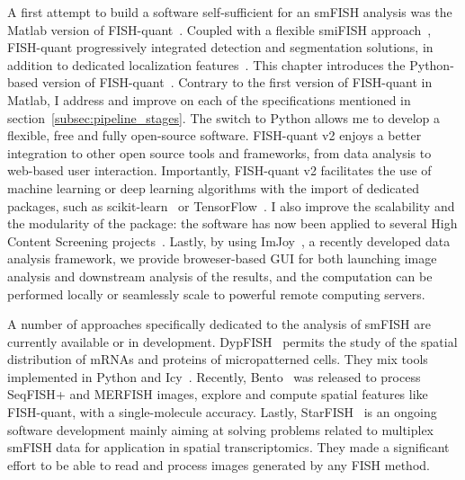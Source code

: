A first attempt to build a software self-sufficient for an \ac{smFISH} analysis was the Matlab version of FISH-quant~\cite{mueller_fish-quant_2013}.
Coupled with a flexible \ac{smiFISH} approach~\cite{tsanov_smifish_2016}, FISH-quant progressively integrated detection and segmentation solutions, in addition to dedicated localization features~\cite{samacoits_computational_2018}.
This chapter introduces the Python-based version of FISH-quant~\cite{Imbert_fq_2022}.
Contrary to the first version of FISH-quant in Matlab, I address and improve on each of the specifications mentioned in section~\ref{subsec:pipeline_stages}.
The switch to Python allows me to develop a flexible, free and fully open-source software.
FISH-quant v2 enjoys a better integration to other open source tools and frameworks, from data analysis to web-based user interaction.
Importantly, FISH-quant v2 facilitates the use of machine learning or deep learning algorithms with the import of dedicated packages, such as scikit-learn~\cite{pedregosa11a_scikitlearn} or TensorFlow~\cite{tensorflow_2015}.
I also improve the scalability and the modularity of the package: the software has now been applied to several High Content Screening projects~\cite{CHOUAIB_2020,safieddine_choreography_2021,pichon_kinesin_2021}.
Lastly, by using ImJoy~\cite{ouyang_imjoy_2019}, a recently developed data analysis framework, we provide broweser-based \ac{GUI} for both launching image analysis and downstream analysis of the results, and the computation can be performed locally or seamlessly scale to powerful remote computing servers.

A number of approaches specifically dedicated to the analysis of \ac{smFISH} are currently available or in development.
DypFISH~\cite{savulescu_dypfish_2019,savulescu_interrogating_2021} permits the study of the spatial distribution of \ac{mRNA}s and proteins of micropatterned cells.
They mix tools implemented in Python and Icy~\cite{de_chaumont_icy_2012}.
Recently, Bento~\cite{mah_bento_2022} was released to process \ac{SeqFISH}+ and \ac{MERFISH} images, explore and compute spatial features like FISH-quant, with a single-molecule accuracy.
Lastly, StarFISH~\cite{perkel_starfish_2019} is an ongoing software development mainly aiming at solving problems related to multiplex \ac{smFISH} data for application in spatial transcriptomics.
They made a significant effort to be able to read and process images generated by any \ac{FISH} method.

